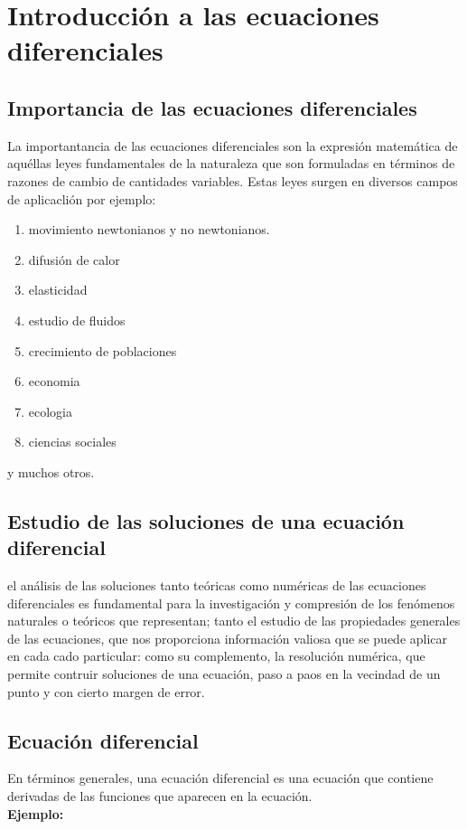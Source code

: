 \documentclass{article}
\begin{document}
    \section{Introducción a las ecuaciones diferenciales}
    \subsection{Importancia de las ecuaciones diferenciales}
    La importantancia de las ecuaciones diferenciales son la expresión 
    matemática de aquéllas leyes fundamentales 
    de la naturaleza que son formuladas en términos de razones de cambio
    de cantidades variables.
    Estas leyes surgen en diversos campos de aplicaclión por ejemplo:
    \begin{enumerate}
        \item movimiento newtonianos y no newtonianos.
        \item difusión de calor
        \item elasticidad
        \item estudio de fluidos
        \item crecimiento de poblaciones 
        \item economia
        \item ecologia
        \item ciencias sociales 
    \end{enumerate}
    y muchos otros.
    \subsection{Estudio de las soluciones de una ecuación diferencial}
    el análisis de las soluciones tanto teóricas como numéricas de las ecuaciones
    diferenciales es fundamental para la investigación y compresión de los fenómenos naturales
    o teóricos que representan; tanto el estudio de las propiedades generales de las ecuaciones, que nos 
    proporciona información valiosa que se puede aplicar en cada cado particular: como su complemento, la resolución numérica,
    que permite contruir soluciones de una ecuación, paso a paos en la vecindad de un punto y con cierto margen de error.
    \subsection{Ecuación diferencial}
    En términos generales, una ecuación diferencial es una ecuación que 
    contiene derivadas de las funciones que aparecen en la ecuación.
    \\
    \textbf{Ejemplo:}
    \\
    
\end{document}
